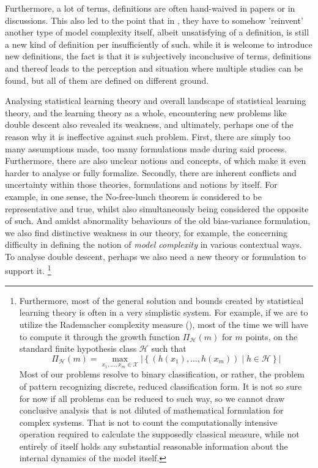 Furthermore, a lot of terms, definitions are often hand-waived in papers or in discussions. This also led to the point that in \cite{nakkiran_deep_2019}, they have to somehow 'reinvent' another type of model complexity itself, albeit unsatisfying of a definition, is still a new kind of definition per insufficiently of such. while it is welcome to introduce new definitions, the fact is that it is subjectively inconclusive of terms, definitions and thereof leads to the perception and situation where multiple studies can be found, but all of them are defined on different ground.

Analysing statistical learning theory and overall landscape of statistical learning theory, and the learning theory as a whole, encountering new problems like double descent also revealed its weakness, and ultimately, perhaps one of the reason why it is ineffective against such problem. First, there are simply too many assumptions made, too many formulations made during said process. Furthermore, there are also unclear notions and concepts, of which make it even harder to analyse or fully formalize. Secondly, there are inherent conflicts and uncertainty within those theories, formulations and notions by itself. For example, in one sense, the No-free-lunch theorem is considered to be representative and true, whilst also simultaneously being considered the opposite of such. And amidst abnormality behaviours of the old bias-variance formulation, we also find distinctive weakness in our theory, for example, the concerning difficulty in defining the notion of \textit{model complexity} in various contextual ways. To analyse double descent, perhaps we also need a new theory or formulation to support it. \footnote{Furthermore, most of the general solution and bounds created by statistical learning theory is often in a very simplistic system. For example, if we are to utilize the Rademacher complexity measure (\cite{10.5555/2371238}), most of the time we will have to compute it through the growth function $\Pi_{\mathcal{H}}(m)$ for $m$ points, on the standard finite hypothesis class $\mathcal{H}$ such that 
\begin{equation}
    \Pi_{\mathcal{H}}(m) = \max_{x_1, \dots, x_m \in \mathcal{X}} \left| \left\{ (h(x_1), \dots, h(x_m)) \mid h \in \mathcal{H} \right\} \right|
\end{equation}
Most of our problems resolve to binary classification, or rather, the problem of pattern recognizing discrete, reduced classification form. It is not so sure for now if all problems can be reduced to such way, so we cannot draw conclusive analysis that is not diluted of mathematical formulation for complex systems. That is not to count the computationally intensive operation required to calculate the supposedly classical measure, while not entirely of itself holds any substantial reasonable information about the internal dynamics of the model itself. }

